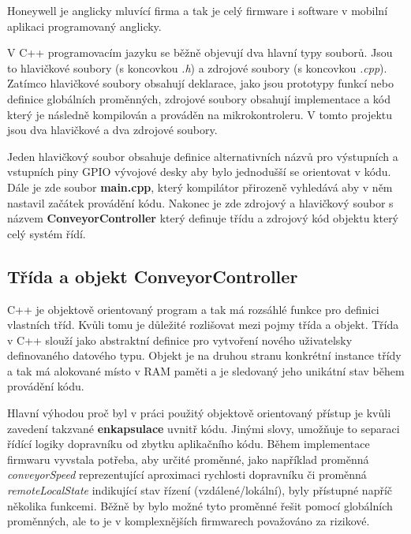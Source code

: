 Honeywell je anglicky mluvící firma a tak je celý firmware i software v mobilní aplikaci programovaný anglicky.

V C++ programovacím jazyku se běžně objevují dva hlavní typy souborů. Jsou to hlavičkové soubory (s koncovkou \textit{.h}) a zdrojové soubory (s koncovkou \textit{.cpp}). Zatímco hlavičkové soubory obsahují deklarace, jako jsou prototypy funkcí nebo definice globálních proměnných, zdrojové soubory obsahují implementace a kód který je následně kompilován a prováděn na mikrokontroleru. V tomto projektu jsou dva hlavičkové a dva zdrojové soubory.

Jeden hlavičkový soubor obsahuje definice alternativních názvů pro výstupních a vstupních piny GPIO vývojové desky aby bylo jednodušší se orientovat v kódu. Dále je zde soubor \textbf{main.cpp}, který kompilátor přirozeně vyhledává aby v něm nastavil začátek provádění kódu. Nakonec je zde zdrojový a hlavičkový soubor s názvem \textbf{ConveyorController} který definuje třídu a zdrojový kód objektu který celý systém řídí.

\subsection{Třída a objekt ConveyorController}\label{sec:ConveyorController}

C++ je objektově orientovaný program a tak má rozsáhlé funkce pro definici vlastních tříd. Kvůli tomu je důležité rozlišovat mezi pojmy třída a objekt. Třída v C++ slouží jako abstraktní definice pro vytvoření nového uživatelsky definovaného datového typu. Objekt je na druhou stranu konkrétní instance třídy a tak má alokované místo v RAM paměti a je sledovaný jeho unikátní stav během provádění kódu.
\cite{CppObjectAndClassArticle}

Hlavní výhodou proč byl v práci použitý objektově orientovaný přístup je kvůli zavedení takzvané \textbf{enkapsulace} uvnitř kódu. Jinými slovy, umožňuje to separaci řídící logiky dopravníku od zbytku aplikačního kódu. Během implementace firmwaru vyvstala potřeba, aby určité proměnné, jako například proměnná \textit{conveyorSpeed} reprezentující aproximaci rychlosti dopravníku či proměnná \textit{remoteLocalState} indikující stav řízení (vzdálené/lokální), byly přístupné napříč několika funkcemi. Běžně by bylo možné tyto proměnné řešit pomocí globálních proměnných, ale to je v komplexnějších firmwarech považováno za rizikové.
\cite{EnkapsulaceVCppArikl}

